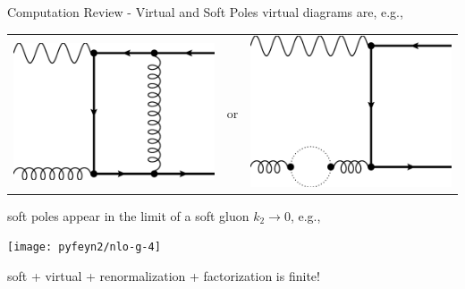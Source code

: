 \begin{frame}{Computation Review - Virtual and Soft Poles}
virtual diagrams are, e.g.,
\begin{center}
\begin{tabular}{wnw}
\includegraphics[width=.25\textwidth]{img/nlo-v-1}
&or
&\includegraphics[width=.25\textwidth]{img/nlo-v-5}
\end{tabular}
\end{center}

soft poles appear in the limit of a soft gluon $k_2\rightarrow 0$, e.g.,
\begin{center}
\texttt{[image: pyfeyn2/nlo-g-4]}
\end{center}

soft + virtual + renormalization + factorization is finite!
\end{frame}
